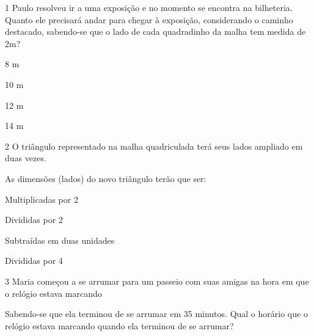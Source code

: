 

\num{1} Paulo resolveu ir a uma exposição e no momento se encontra na
bilheteria. Quanto ele precisará andar para chegar à exposição,
considerando o caminho destacado, sabendo-se que o lado de cada
quadradinho da malha tem medida de 2m?


\begin{escolha}
\item
  8 m
\item
  10 m
\item
  12 m
\item
  14 m
\end{escolha}


\num{2} O triângulo representado na malha quadriculada terá seus lados
ampliado em duas vezes.


As dimensões (lados) do novo triângulo terão que ser:

\begin{escolha}
\item
  Multiplicadas por 2
\item
  Divididas por 2
\item
  Subtraídas em duas unidades
\item
  Divididas por 4
\end{escolha}


\num{3} Maria começou a se arrumar para um passeio com suas amigas na hora
em que o relógio estava marcando


Sabendo-se que ela terminou de se arrumar em 35 minutos. Qual o horário
que o relógio estava marcando quando ela terminou de se arrumar?

